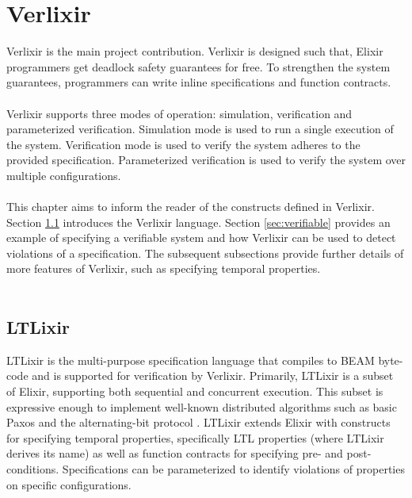 \chapter{Verlixir} \label{chap:verlixir}
Verlixir is the main project contribution. Verlixir is designed such that, Elixir programmers get deadlock safety guarantees for free. To strengthen the system guarantees, programmers can write inline specifications and function contracts. 
\\ \\
Verlixir supports three modes of operation: simulation, verification and parameterized verification. Simulation mode is used to run a single execution of the system. Verification mode is used to verify the system adheres to the provided specification. Parameterized verification is used to verify the system over multiple configurations.
\\ \\
This chapter aims to inform the reader of the constructs defined in Verlixir. Section \ref{sec:ltlixir} introduces the Verlixir language. Section \ref{sec:verifiable} provides an example of specifying a verifiable system and how Verlixir can be used to detect violations of a specification. The subsequent subsections provide further details of more features of Verlixir, such as specifying temporal properties.
\\ \\
\section{LTLixir} \label{sec:ltlixir}
LTLixir is the multi-purpose specification language that compiles to BEAM byte-code and is supported for verification by Verlixir. Primarily, LTLixir is a subset of Elixir, supporting both sequential and concurrent execution. This subset is expressive enough to implement well-known distributed algorithms such as basic Paxos \cite{basic_paxos} and the alternating-bit protocol \cite{ab_protocol}. LTLixir extends Elixir with constructs for specifying temporal properties, specifically LTL properties (where LTLixir derives its name) as well as function contracts for specifying pre- and post-conditions. Specifications can be parameterized to identify violations of properties on specific configurations. 
\\ \\

